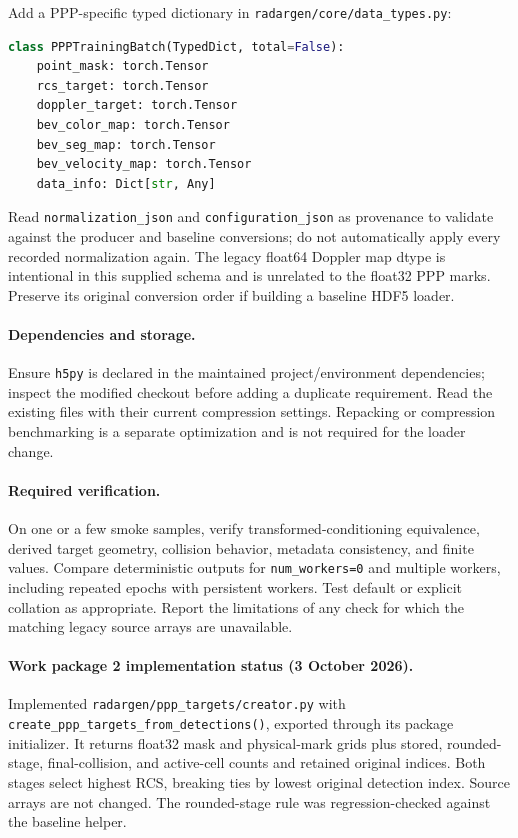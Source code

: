 \documentclass[11pt,a4paper]{article}
\begin{document}
Add a PPP-specific typed dictionary in \texttt{radargen/core/data\_types.py}:
\begin{lstlisting}[language=Python]
class PPPTrainingBatch(TypedDict, total=False):
    point_mask: torch.Tensor
    rcs_target: torch.Tensor
    doppler_target: torch.Tensor
    bev_color_map: torch.Tensor
    bev_seg_map: torch.Tensor
    bev_velocity_map: torch.Tensor
    data_info: Dict[str, Any]
\end{lstlisting}
Read \texttt{normalization\_json} and \texttt{configuration\_json} as provenance to validate against the producer and baseline conversions; do not automatically apply every recorded normalization again. The legacy float64 Doppler map dtype is intentional in this supplied schema and is unrelated to the float32 PPP marks. Preserve its original conversion order if building a baseline HDF5 loader.

\paragraph{Dependencies and storage.}
Ensure \texttt{h5py} is declared in the maintained project/environment dependencies; inspect the modified checkout before adding a duplicate requirement. Read the existing files with their current compression settings. Repacking or compression benchmarking is a separate optimization and is not required for the loader change.

\paragraph{Required verification.}
On one or a few smoke samples, verify transformed-conditioning equivalence, derived target geometry, collision behavior, metadata consistency, and finite values. Compare deterministic outputs for \texttt{num\_workers=0} and multiple workers, including repeated epochs with persistent workers. Test default or explicit collation as appropriate. Report the limitations of any check for which the matching legacy source arrays are unavailable.

\paragraph{Work package 2 implementation status (3 October 2026).}
Implemented \texttt{radargen/ppp\_targets/creator.py} with
\texttt{create\_ppp\_targets\_from\_detections()}, exported through its
package initializer. It returns float32 mask and physical-mark grids plus
stored, rounded-stage, final-collision, and active-cell counts and retained
original indices. Both stages select highest RCS, breaking ties by lowest
original detection index. Source arrays are not changed.
The rounded-stage rule was regression-checked against the baseline helper.
\end{document}

